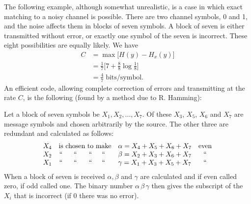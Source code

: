 The following example, although somewhat unrealistic,
is a case in which
exact matching to a noisy channel is possible.  There are two channel
symbols, 0 and 1, and the noise affects them in blocks of seven symbols.
A block of seven is either transmitted without error, or exactly one
symbol of the seven is incorrect.  These eight possibilities are equally
likely.  We have
\begin{align*}
C &= \max \bigl[ H(y) - H_x(y) \bigr] \\
&= \tfrac17 \bigl[ 7 + \tfrac88\log \tfrac18 \bigr] \\
&= \tfrac47 \;\text{bits/symbol}.
\end{align*}
An efficient code, allowing complete correction of errors and transmitting
at the rate $C$, is the following (found by a method due to R. Hamming):

Let a block of seven symbols be $X_1, X_2,\dots, X_7$.  Of these $X_3$,
$X_5$, $X_6$ and $X_7$ are message symbols and chosen arbitrarily by
the source.  The other three are redundant and calculated as follows:
$$
\begin{array}{c c@{~}c@{~}c@{~}c l c}
X_4 & \text{is} & \text{chosen} & \text{to} & \text{make}
	 & \alpha = X_4 + X_5 + X_6 + X_7 & \text{even} \\
X_2 & \text{``} & \text{``} & \text{``} & \text{``}
	 & \beta = X_2 + X_3 + X_6 + X_7 & \text{``} \\
X_1 & \text{``} & \text{``} & \text{``} & \text{``}
	& \gamma = X_1 + X_3 + X_5 + X_7 & \text{``}
\end{array}
$$
When a block of seven is received $\alpha , \beta$ and $\gamma$ are
calculated and if even called zero, if odd called one.  The binary
number $\alpha\,\beta\,\gamma$ then gives the subscript of the $X_i$
that is incorrect (if 0 there was no error).

